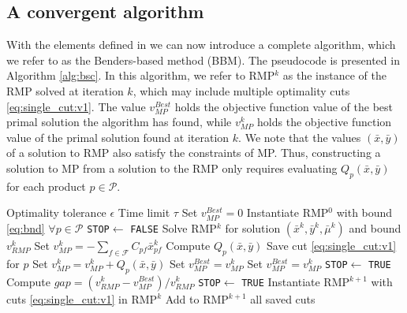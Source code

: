 \documentclass[12pt]{article}
\theoremstyle{thmstylethree}%
\begin{document}
\subsection{A convergent algorithm}
\label{subsec:alg_convergence}
With the elements defined in  we can now introduce a complete algorithm, which we refer to as the Benders-based method (BBM). The pseudocode is presented in Algorithm \ref{alg:bsc}. In this algorithm, we refer to RMP$^{k}$ as the instance of the RMP solved at iteration $k$, which may include multiple optimality cuts \eqref{eq:single_cut:v1}. The value $v_{MP}^{Best}$ holds the objective function value of the best primal solution the algorithm has found, while $v_{MP}^{k}$ holds the objective function value of the primal solution found at iteration $k$. We note that the values $(\bar{x},\bar{y})$ of a solution to RMP also satisfy the constraints of MP. Thus, constructing a solution to MP from a solution to the RMP only requires evaluating $Q_{p}(\bar{x},\bar{y})$ for each product $p \in \mathcal{P}$.

\begin{algorithm}[htp]
\caption{Benders-based algorithm}\label{alg:bsc}
\begin{algorithmic}
\small
\Require Optimality tolerance $\epsilon$
\Require Time limit $\tau$
\State Set $v_{MP}^{Best}=0$
\State Instantiate RMP$^{0}$ with bound \eqref{eq:bnd} $\forall p \in \mathcal{P}$
\State \texttt{STOP}$\gets$ \texttt{FALSE}
	\State Solve RMP$^{k}$ for solution $(\bar{x}^{k},\bar{y}^{k},\bar{\mu}^{k})$ and bound $v_{RMP}^{k}$
	\State Set $v_{MP}^{k} = - \sum_{f \in \mathcal{F}} C_{pf}\bar{x}^k_{pf} $
        \State Compute $Q_p(\bar{x},\bar{y})$  
			\State Save cut \eqref{eq:single_cut:v1} for $p$
		\EndIf
		\State Set $v_{MP}^{k} = v_{MP}^{k} + Q_{p}(\bar{x},\bar{y})$
	\EndFor
		\State Set $v_{MP}^{Best} = v_{MP}^{k}$
    \EndIf
		\State Set $v_{MP}^{Best} = v_{MP}^{k}$
		\State \texttt{STOP}$\gets$ \texttt{TRUE}
	\Else	
		\State Compute  $gap=(v_{RMP}^{k} - v_{MP}^{Best})/v_{RMP}^{k}$
			\State \texttt{STOP}$\gets$ \texttt{TRUE}
		\Else
			\State Instantiate RMP$^{k+1}$ with cuts \eqref{eq:single_cut:v1} in RMP$^{k}$
			\State Add to RMP$^{k+1}$ all saved cuts
		\EndIf
	\EndIf
\EndWhile
\end{algorithmic}
\end{algorithm}
\end{document}
